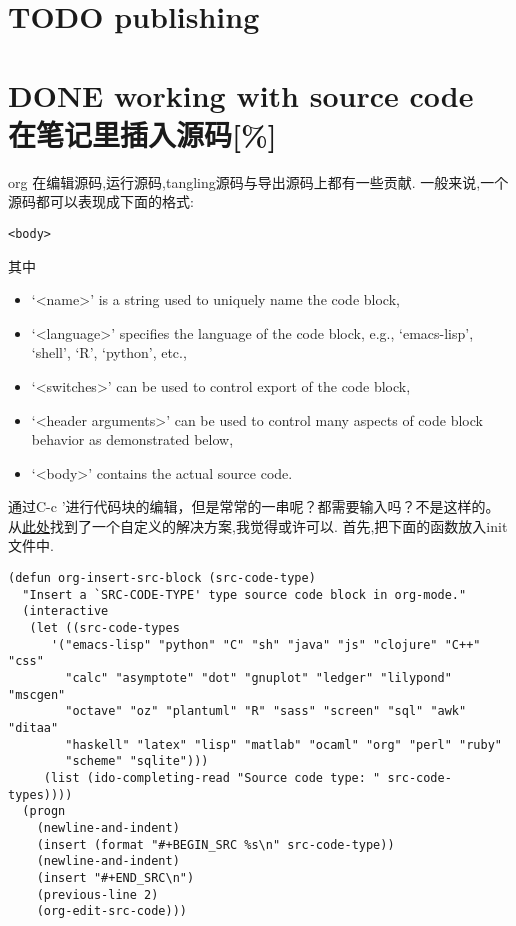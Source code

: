 \documentclass[10pt,a4paper]{article}
\begin{document}
\section{{\bfseries\sffamily TODO} publishing}
\label{sec:orgbbdf53c}

\section{{\bfseries\sffamily DONE} working with source code 在笔记里插入源码[\%]}
\label{sec:org7095523}
org 在编辑源码,运行源码,tangling源码与导出源码上都有一些贡献.
一般来说,一个源码都可以表现成下面的格式:
\begin{verbatim}
<body>
\end{verbatim}

其中
\begin{itemize}
\item ‘<name>’ is a string used to uniquely name the code block,
\item ‘<language>’ specifies the language of the code block, e.g., ‘emacs-lisp’, ‘shell’, ‘R’, ‘python’, etc.,
\item ‘<switches>’ can be used to control export of the code block,
\item ‘<header arguments>’ can be used to control many aspects of code block behavior as demonstrated below,
\item ‘<body>’ contains the actual source code.
\end{itemize}

通过C-c '进行代码块的编辑，但是常常的一串呢？都需要输入吗？不是这样的。
从\href{http://wenshanren.org/?p=327}{此处}找到了一个自定义的解决方案,我觉得或许可以.
首先,把下面的函数放入init文件中.


\begin{verbatim}
(defun org-insert-src-block (src-code-type)
  "Insert a `SRC-CODE-TYPE' type source code block in org-mode."
  (interactive
   (let ((src-code-types
	  '("emacs-lisp" "python" "C" "sh" "java" "js" "clojure" "C++" "css"
	    "calc" "asymptote" "dot" "gnuplot" "ledger" "lilypond" "mscgen"
	    "octave" "oz" "plantuml" "R" "sass" "screen" "sql" "awk" "ditaa"
	    "haskell" "latex" "lisp" "matlab" "ocaml" "org" "perl" "ruby"
	    "scheme" "sqlite")))
     (list (ido-completing-read "Source code type: " src-code-types))))
  (progn
    (newline-and-indent)
    (insert (format "#+BEGIN_SRC %s\n" src-code-type))
    (newline-and-indent)
    (insert "#+END_SRC\n")
    (previous-line 2)
    (org-edit-src-code)))

\end{verbatim}
\end{document}
